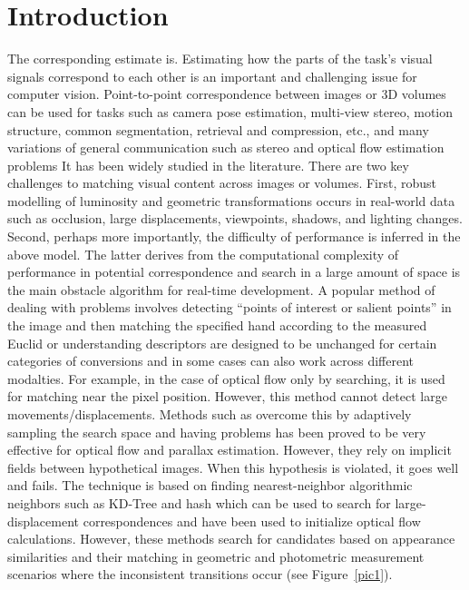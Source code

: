 \documentclass[10pt,twocolumn,letterpaper]{article}
\begin{document}
\section{Introduction}
The corresponding estimate is. Estimating how the parts of the task's visual signals correspond to each other is an important and challenging issue for computer vision. Point-to-point correspondence between images or 3D volumes can be used for tasks such as camera pose estimation, multi-view stereo, motion structure, common segmentation, retrieval and compression, etc., and many variations of general communication such as stereo and optical flow estimation problems It has been widely studied in the literature. There are two key challenges to matching visual content across images or volumes. First, robust modelling of luminosity and geometric transformations occurs in real-world data such as occlusion, large displacements, viewpoints, shadows, and lighting changes. Second, perhaps more importantly, the difficulty of performance is inferred in the above model. The latter derives from the computational complexity of performance in potential correspondence and search in a large amount of space is the main obstacle algorithm for real-time development. A popular method of dealing with problems involves detecting “points of interest or salient points” in the image and then matching the specified hand\cite{Lowe_1999_Object} according to the measured Euclid or understanding\cite{Bristow_2015_Dense} descriptors are designed to be unchanged for certain categories of conversions and in some cases can also work across different modalties. For example, in the case of optical flow only by searching, it is used for matching near the pixel position. However, this method cannot detect large movements/displacements. Methods such as\cite{Barnes_2010_The} overcome this by adaptively sampling the search space and having problems has been proved to be very effective for optical flow and parallax estimation\cite{Bleyer_2011_Patchmatch}. However, they rely on implicit fields between hypothetical images. When this hypothesis is violated, it goes well and fails. The technique is based on finding nearest-neighbor algorithmic neighbors such as KD-Tree\cite{He_2012_Computing} and hash\cite{Chen_2013_Large} which can be used to search for large-displacement correspondences and have been used to initialize optical flow calculations\cite{Xu_2012_Motion}. However, these methods search for candidates based on appearance similarities and their matching in geometric and photometric measurement scenarios where the inconsistent transitions occur (see Figure~\ref{pic1}).
\end{document}
